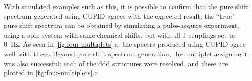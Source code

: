 With simulated examples such as this, it is possible to confirm that the pure
shift spectrum generated using \ac{CUPID} agrees with the expected result; the
``true'' pure shift spectrum can be obtained by simulating a pulse-acquire
experiment, using a spin system with same chemical shifts, but with all J-couplings
set to \qty{0}{\hertz}. As seen in \cref{fig:four-multiplets}.a. the spectra
produced using \ac{CUPID} agree well with these. Beyond pure shift spectrum
generation, the multiplet assignment was also successful; each of the ddd
structures were resolved, and these are plotted in
\cref{fig:four-multiplets}.c.


